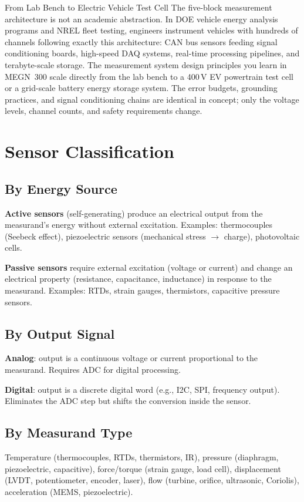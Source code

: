 \documentclass[11pt,letterpaper,twoside,openany]{book}
\begin{document}
\begin{industrybox}{From Lab Bench to Electric Vehicle Test Cell}
The five-block measurement architecture is not an academic abstraction. In DOE vehicle energy analysis programs and NREL fleet testing, engineers instrument vehicles with hundreds of channels following exactly this architecture: CAN bus sensors feeding signal conditioning boards, high-speed DAQ systems, real-time processing pipelines, and terabyte-scale storage. The measurement system design principles you learn in MEGN~300 scale directly from the lab bench to a 400\,V EV powertrain test cell or a grid-scale battery energy storage system. The error budgets, grounding practices, and signal conditioning chains are identical in concept; only the voltage levels, channel counts, and safety requirements change.
\end{industrybox}

\section{Sensor Classification}

\subsection{By Energy Source}
\textbf{Active sensors} (self-generating) produce an electrical output from the measurand's energy without external excitation. Examples: thermocouples (Seebeck effect), piezoelectric sensors (mechanical stress $\to$ charge), photovoltaic cells.

\textbf{Passive sensors} require external excitation (voltage or current) and change an electrical property (resistance, capacitance, inductance) in response to the measurand. Examples: RTDs, strain gauges, thermistors, capacitive pressure sensors.

\subsection{By Output Signal}
\textbf{Analog}: output is a continuous voltage or current proportional to the measurand. Requires ADC for digital processing.

\textbf{Digital}: output is a discrete digital word (e.g., I2C, SPI, frequency output). Eliminates the ADC step but shifts the conversion inside the sensor.

\subsection{By Measurand Type}
Temperature (thermocouples, RTDs, thermistors, IR), pressure (diaphragm, piezoelectric, capacitive), force/torque (strain gauge, load cell), displacement (LVDT, potentiometer, encoder, laser), flow (turbine, orifice, ultrasonic, Coriolis), acceleration (MEMS, piezoelectric).
\end{document}
